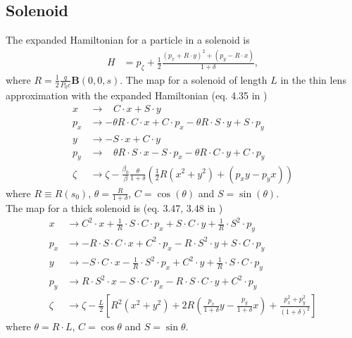 \subsection{Solenoid}
The expanded Hamiltonian for a particle in a solenoid is
\begin{align*}
  H &= p_\zeta+\frac{1}{2}\frac{(p_x+R\cdot y)^2+(p_y-R\cdot x)}{1+\delta},
\end{align*}
where $R=\frac{1}{2}\frac{q}{P_0c}\mathbf{B}(0,0,s)$. The map for a solenoid 
of length $L$ in the thin lens approximation with the expanded 
Hamiltonian (eq. 4.35 in \cite{heinemann95})
\begin{align*}
  x   &\to \,\,\,\,\, C\cdot x + S\cdot y \\
  p_x &\to -\theta R\cdot C \cdot x+C\cdot p_x
        -\theta R\cdot S\cdot y+S\cdot p_y \\
  y   &\to -S\cdot x + C\cdot y \\
  p_y &\to \,\,\,\,\, \theta R\cdot S\cdot x - S\cdot p_x 
  - \theta R\cdot C \cdot y + C\cdot p_y \\
  \zeta &\to \zeta - \frac{\beta_0}{\beta}
  \frac{\theta}{1+\delta} \left(\frac{1}{2}
  R (x^2 + y^2) + (p_xy - p_yx)\right)
\end{align*}
where $R\equiv R(s_0)$, $\theta=\frac{R}{1+\delta}$, 
$C=\cos(\theta)$ and $S=\sin(\theta)$.\\[0.5em]
The map for a thick solenoid is (eq. 3.47, 3.48 in \cite{ripken85}) 
\begin{align*}
    x &\to C^2 \cdot x+\frac{1}{R}\cdot S\cdot C\cdot p_x+S\cdot C\cdot y
    + \frac{1}{R}\cdot S^2 \cdot p_y \\
    p_x &\to -R\cdot S\cdot C\cdot x + C^2\cdot p_x
    -R\cdot S^2\cdot y + S\cdot C\cdot p_y \\
    y &\to -S\cdot C\cdot x -\frac{1}{R}\cdot S^2 \cdot p_x
    +C^2\cdot y + \frac{1}{R}\cdot S\cdot C\cdot p_y \\
    p_y &\to R\cdot S^2\cdot x -S\cdot C\cdot p_x
    -R\cdot S\cdot C\cdot y + C^2\cdot p_y \\
    \zeta &\to \zeta - \frac{L}{2} \left[R^2(x^2+y^2)+2R\left(
    \frac{p_x}{1+\delta}y - \frac{p_y}{1+\delta}x\right) 
    + \frac{p_x^2+p_y^2}{(1+\delta)^2} \right]
\end{align*}
where $\theta=R\cdot L$, $C=\cos\theta$ and $S=\sin\theta$.


